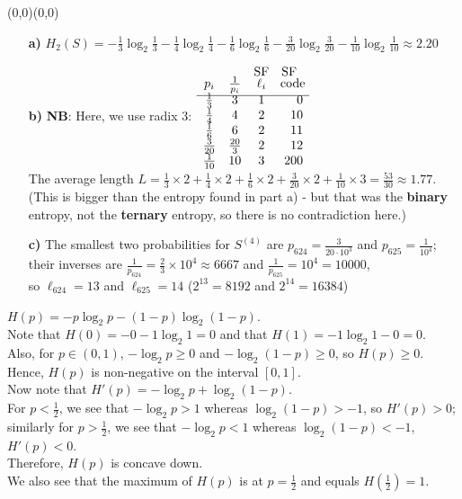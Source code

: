 \documentclass[11pt]{article}
\newcommand{\upabit}{\begin{picture}(0,0)(0,0)\end{picture}\vspace*{-5mm}}
\begin{document}
\bigskip{}\upabit
\begin{itemize}
   \item[{\bf a)}] $H_2(S) = -\frac{1}{3} \log_2\frac{1}{3}  -\frac{1}{4} \log_2\frac{1}{4} -\frac{1}{6}\log_2\frac{1}{6}
                             -\frac{3}{20}\log_2\frac{3}{20} -\frac{1}{10}\log_2\frac{1}{10}
                    \approx 2.20$
   \item[{\bf b)}] {\bf NB}: Here, we use radix 3:
          $\begin{array}{cccr}
                    &               & \text{SF} &  \text{SF\;\:}\\[-1mm]
           p_i      & \frac{1}{p_i} & \ell_i    &\!\text{code}\!\\[1mm]\hline\\[-5mm]
        \frac{1}{3} &      3        &   1       &    0\\
        \frac{1}{4} &      4        &   2       &   10\\
        \frac{1}{6} &      6        &   2       &   11\\
        \frac{3}{20}& \frac{20}{3}  &   2       &   12\\
        \frac{1}{10}&     10        &   3       &  200\end{array}$
     \\The average length $L = \frac{1}{3}\times 2 + \frac{1}{4}\times 2 + \frac{1}{6}\times 2 + \frac{3}{20}\times 2 + \frac{1}{10}\times 3 = \frac{53}{30} \approx 1.77$.
     \\(This is bigger than the entropy found in part a) - but that was the {\bf binary} entropy, not the {\bf ternary} entropy,
        so there is no contradiction here.)
   \item[{\bf c)}] The smallest two probabilities for $S^{(4)}$ are $p_{624} = \frac{3}{20\cdot10^3}$ and $p_{625} = \frac{1}{10^4}$;
     \\their inverses are
     $\frac{1}{p_{624}} = \frac{2}{3}\times 10^4 \approx 6667$ and
     $\frac{1}{p_{625}} = 10^4 = 10000$,
     \\so $\ell_{624} = 13$ and $\ell_{625} = 14$ \: ($2^{13} = 8192$ and $2^{14} = 16384$)
\end{itemize}

\bigskip{}
$H(p) = -p\log_2 p - (1-p)\log_2(1-p)$.
\\Note that $H(0) = -0 - 1\log_2 1 = 0$
  and  that $H(1) = -1\log_2 1 - 0 = 0$.
\\Also, for $p\in (0,1)$, $-\log_2 p\geq 0$ and $-\log_2 (1-p)\geq 0$,
  so $H(p) \geq 0$.
\\Hence, $H(p)$ is non-negative on the interval $[0,1]$.
\\Now note that $H'(p) = -\log_2 p + \log_2(1-p)$.
\\For $p<\frac{1}{2}$, we see that $-\log_2 p > 1$ whereas $\log_2(1-p)>-1$, so $H'(p) > 0$;
\\similarly for $p>\frac{1}{2}$, we see that $-\log_2 p < 1$ whereas $\log_2(1-p)<-1$, $H'(p) < 0$.
\\Therefore, $H(p)$ is concave down.
\\We also see that the maximum of $H(p)$ is at $p = \frac{1}{2}$ and equals $H(\frac{1}{2}) = 1$.
\end{document}
